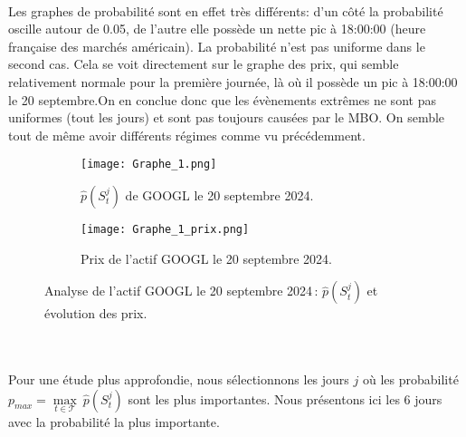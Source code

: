 \documentclass[12pt,a4paper]{article}
\theoremstyle{definition}
\theoremstyle{remark}
\begin{document}
\\
Les graphes de probabilité sont en effet très différents: d'un côté la probabilité oscille autour de 0.05, de l'autre elle possède un nette pic à 18:00:00 (heure française des marchés américain). La probabilité n'est pas uniforme dans le second cas. Cela se voit directement sur le graphe des prix, qui semble relativement normale pour la première journée, là où il possède un pic à 18:00:00 le 20 septembre.On en conclue donc que les évènements extrêmes ne sont pas uniformes (tout les jours) et sont pas toujours causées par le MBO. On semble tout de même avoir différents régimes comme vu précédemment.
\begin{figure}[h!]
    \centering
    \begin{subfigure}[b]{0.48\textwidth}
        \centering
        \texttt{[image: Graphe\_1.png]}
        \caption{$\hat{p}(S_t^j)$ de GOOGL le 20 septembre 2024.}
        \label{fig:graphe1}
    \end{subfigure}
    \hfill
    \begin{subfigure}[b]{0.48\textwidth}
        \centering
        \texttt{[image: Graphe\_1\_prix.png]}
        \caption{Prix de l'actif GOOGL le 20 septembre  2024.}
        \label{fig:graphe2}
    \end{subfigure}

    \caption{Analyse de l'actif GOOGL le 20 septembre  2024 : $\hat{p}(S_t^j)$ et évolution des prix.}
    \label{fig:side_by_side}
\end{figure}
\\
\\
Pour une étude plus approfondie, nous sélectionnons les jours $j$ où les probabilité $p_{max} = \underset{t\in \mathcal{T}}{\max}\ \hat{p}(S_t^j)$ sont les plus importantes.  Nous présentons ici les 6 jours avec la probabilité la plus importante.
\\
\\
\end{document}
